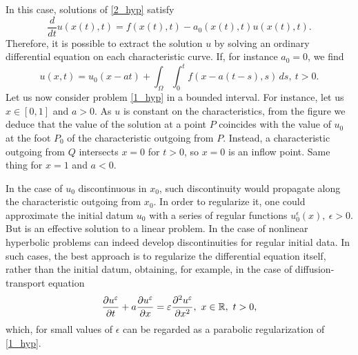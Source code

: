 In this case, solutions of \eqref{2_hyp} satisfy
\[
    \frac{d}{dt} u(x(t), t) = f(x(t), t) - a_0(x(t),t)u(x(t),t).
\]
Therefore, it is possible to extract the solution \(u\) by solving an ordinary differential equation on each characteristic curve. If, for instance \(a_0 = 0\), we find 
\[
    u(x,t) = u_0(x-at) + \int_\Omega \int_0^t f(x-a(t-s),s) \, ds, \ t > 0.
\]
Let us now consider problem \eqref{1_hyp} in a bounded interval. For instance, let us \(x \in [0,1]\) and \(a > 0\). As \(u\) is constant on the characteristics, from the figure we deduce that the value of the solution at a point \(P\) coincides with the value of \(u_0\) at the foot \(P_0\) of the characteristic outgoing from \(P\). Instead, a characteristic outgoing from \(Q\) intersects \(x=0\) for \(t>0\), so \(x=0\) is an inflow point. Same thing for \(x=1\) and \(a<0\).

In the case of \(u_0\) discontinuous in \(x_0\), such discontinuity would propagate along the characteristic outgoing from \(x_0\). In order to regularize it, one could approximate the initial datum \(u_0\) with a series of regular functions \(u_0^\epsilon(x), \ \epsilon > 0\). But is an effective solution to a linear problem. In the case of nonlinear hyperbolic problems can indeed develop discontinuities for regular initial data. In such cases, the best approach is to regularize the differential equation itself, rather than the initial datum, obtaining, for example, in the case of diffusion-transport equation 
\[
    \partialderivative{u^\epsilon}{t} + a\partialderivative{u^\epsilon}{x} = \epsilon\partialderivative{^2u^\epsilon}{x^2}, \ x\in \real, \ t > 0,
\]
which, for small values of \(\epsilon\) can be regarded as a parabolic regularization of \eqref{1_hyp}. 
